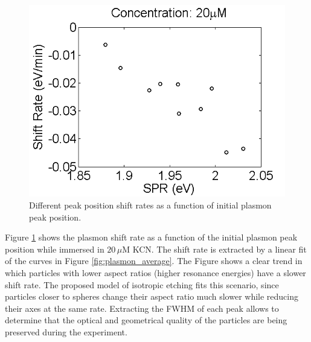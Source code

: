 \documentclass{article}
\begin{document}
\begin{figure}[p]
 \centering
 \includegraphics[width=0.95\linewidth]{shift_rate_vs_spr.png}
 \caption{Different peak position shift rates as a function of initial plasmon
 peak position.}
 \label{fig:shift-vs-spr}
\end{figure}

Figure \ref{fig:shift-vs-spr} shows the plasmon shift rate as a function of the
initial plasmon peak position while immersed in $20\,\mu\textrm{M}$ KCN. The
shift rate is extracted by a linear fit of the curves in Figure
\ref{fig:plasmon_average}. The Figure shows a clear trend in which particles
with lower aspect ratios (higher resonance energies) have a slower shift rate.
The proposed model of isotropic etching fits this scenario, since particles
closer to spheres change their aspect ratio much slower while reducing their
axes at the same rate. Extracting the FWHM of each peak allows to determine that
the optical and geometrical quality of the particles are being preserved during
the experiment. 
\end{document}
